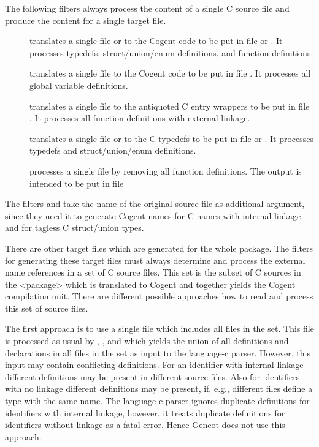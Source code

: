 The following filters always process the content of a single C source file and produce the content for a single 
target file.
\begin{description}
\item[] translates a single file  or  to the Cogent code to be put in file
 or . It processes typedefs, struct/union/enum definitions, and function
definitions. 
\item[] translates a single file  to the Cogent code to be put in file .
It processes all global variable definitions.
\item[] translates a single file  to the antiquoted C entry wrappers to be put in
file . It processes all function definitions with external linkage.
\item[] translates a single file  or  to the C typedefs to be put in
file  or . It processes typedefs and struct/union/enum definitions.
\item[] processes a single file  by removing all function definitions. The output
is intended to be put in file 
\end{description}

The filters  and  take the name of the original source file as additional
argument, since they need it to generate Cogent names for C names with internal linkage and for tagless C struct/union
types.

There are other target files which are generated for the whole package. The filters for generating these target files 
must always determine and process the external name references in a set of
C source files. This set is the subset of C sources in the <package> which is translated to Cogent and together yields
the Cogent compilation unit. There are different possible approaches how to read and process this set of source files.

The first approach is to use a single file which includes all files in the set. This file is processed as usual by
, , and  which yields the union of all definitions
and declarations in all files in the set as input to the language-c parser. However, this input may contain conflicting
definitions. For an identifier with internal linkage different definitions may be present in different source files.
Also for identifiers with no linkage different definitions may be present, if, e.g., different  files define
a type with the same name. The language-c parser ignores duplicate definitions for identifiers with internal linkage,
however, it treats duplicate definitions for identifiers without linkage as a fatal error. Hence Gencot does not use
this approach.

